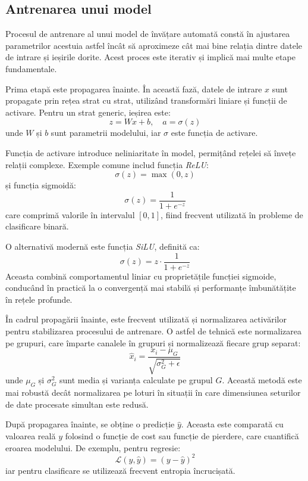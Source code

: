 \subsection*{Antrenarea unui model}

Procesul de antrenare al unui model de învățare automată constă în ajustarea parametrilor acestuia astfel încât să aproximeze cât mai bine relația dintre datele de intrare și ieșirile dorite. Acest proces este iterativ și implică mai multe etape fundamentale.

Prima etapă este propagarea înainte. În această fază, datele de intrare \( x \) sunt propagate prin rețea strat cu strat, utilizând transformări liniare și funcții de activare. Pentru un strat generic, ieșirea este:
\[
z = Wx + b, \quad a = \sigma(z)
\]
unde \( W \) și \( b \) sunt parametrii modelului, iar \( \sigma \) este funcția de activare.

Funcția de activare introduce neliniaritate în model, permițând rețelei să învețe relații complexe. Exemple comune includ funcția \textit{ReLU}:
\[
\sigma(z) = \max(0, z)
\]
și funcția sigmoidă:
\[
\sigma(z) = \frac{1}{1 + e^{-z}}
\]
care comprimă valorile în intervalul \([0,1]\), fiind frecvent utilizată în probleme de clasificare binară.

O alternativă modernă este funcția \textit{SiLU}, definită ca:
\[
\sigma(z) = z \cdot \frac{1}{1 + e^{-z}}
\]
Aceasta combină comportamentul liniar cu proprietățile funcției sigmoide, conducând în practică la o convergență mai stabilă și performanțe îmbunătățite în rețele profunde.

În cadrul propagării înainte, este frecvent utilizată și normalizarea activărilor pentru stabilizarea procesului de antrenare. O astfel de tehnică este normalizarea pe grupuri, care împarte canalele în grupuri și normalizează fiecare grup separat:
\[
\hat{x}_i = \frac{x_i - \mu_G}{\sqrt{\sigma_G^2 + \epsilon}}
\]
unde \( \mu_G \) și \( \sigma_G^2 \) sunt media și varianța calculate pe grupul \( G \). Această metodă este mai robustă decât normalizarea pe loturi în situații în care dimensiunea seturilor de date procesate simultan este redusă.

După propagarea înainte, se obține o predicție \( \hat{y} \). Aceasta este comparată cu valoarea reală \( y \) folosind o funcție de cost sau funcție de pierdere, care cuantifică eroarea modelului. De exemplu, pentru regresie:
\[
\mathcal{L}(y, \hat{y}) = (y - \hat{y})^2
\]
iar pentru clasificare se utilizează frecvent entropia încrucișată.

